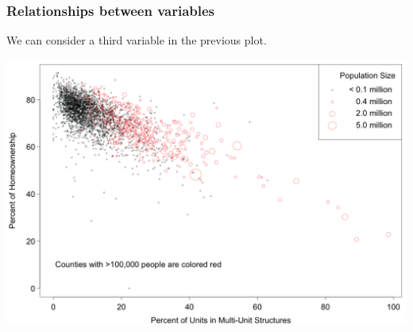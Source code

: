 \documentclass[slides]{beamer}
\begin{document}
\begin{frame}[fragile]
\frametitle{Relationships between variables}
We can consider a third variable in the previous plot.
\begin{center}
\includegraphics[width=\textwidth]{figure/MHP.png}
\end{center}
\end{frame}
\end{document}
